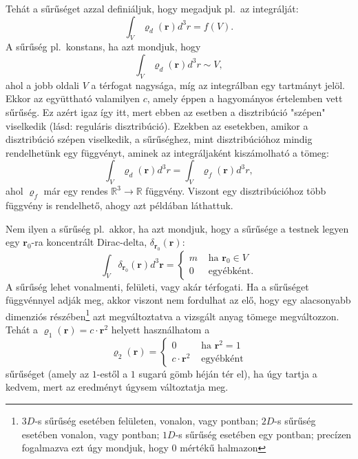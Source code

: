 \documentclass[12pt,a4paper]{scrartcl}
\let\mathbf\bm
\begin{document}
Tehát a sűrűséget azzal definiáljuk, hogy megadjuk pl.\ az integrálját:
\[\int_V {{\varrho _d}\left( {\mathbf{r}} \right){d^3}r}  = f\left( V \right).\]
A sűrűség pl.\ konstans, ha azt mondjuk, hogy
\[\int_V {{\varrho _d}\left( {\mathbf{r}} \right){d^3}r} \sim V,\]
ahol a jobb oldali $V$ a térfogat nagysága, míg az integrálban egy tartmányt jelöl. Ekkor az együttható valamilyen $c$, amely éppen a hagyományos értelemben vett sűrűség. Ez azért igaz így itt, mert ebben az esetben a disztribúció "szépen" viselkedik (lásd: reguláris disztribúció). Ezekben az esetekben, amikor a disztribúció szépen viselkedik, a sűrűséghez, mint disztribúcióhoz mindig rendelhetünk egy függvényt, aminek az integráljaként kiszámolható a tömeg:
\[\int_V {{\varrho _d}\left( {\mathbf{r}} \right){d^3}r}  = \int_V {{\varrho _f}\left( {\mathbf{r}} \right){d^3}r} ,\]
ahol $\varrho _f$ már egy rendes ${\mathbb{R}^3} \to \mathbb{R}$ függvény. Viszont egy disztribúcióhoz több függvény is rendelhető, ahogy azt \az{\eqref{eq:ugyanaz_a_tomeg}} példában láthattuk.

Nem ilyen a sűrűség pl.\ akkor, ha azt mondjuk, hogy a sűrűsége a testnek legyen egy ${{\mathbf{r}}_0}$-ra koncentrált Dirac-delta, $\delta_{{{\mathbf{r}}_0}} \left( {\mathbf{r}} \right)$:
\[\int_V {{\delta _{{{\mathbf{r}}_0}}}\left( {\mathbf{r}} \right)} {d^3}{\mathbf{r}} = \left\{ \begin{array}{lr}
  m&{\text{ ha }}{{\mathbf{r}}_0} \in V \\ 
  0&{\text{ egyébként.}}
\end{array} \right.\]
A sűrűség lehet vonalmenti, felületi, vagy akár térfogati. Ha a sűrűséget függvénnyel adják meg, akkor viszont nem fordulhat az elő, hogy egy alacsonyabb dimenziós részében\footnote{$3D$-s sűrűség esetében felületen, vonalon, vagy pontban; $2D$-s sűrűség esetében vonalon, vagy pontban; $1D$-s sűrűség esetében egy pontban; precízen fogalmazva ezt úgy mondjuk, hogy 0 mértékű halmazon} azt megváltoztatva a vizsgált anyag tömege megváltozzon. Tehát a ${\varrho _1}\left( {\mathbf{r}} \right) = c\cdot {{\mathbf{r}}^2}$ helyett használhatom a 
\[{\varrho _2}\left( {\mathbf{r}} \right) = \left\{ \begin{array}{lr}
  0&{\text{ ha }}{{\mathbf{r}}^2} = 1 \\
  c \cdot {{\mathbf{r}}^2}&{\text{ egyébként}}
\end{array} \right.\]
sűrűséget (amely az $1$-estől a $1$ sugarú gömb héján tér el), ha úgy tartja a kedvem, mert az eredményt úgysem változtatja meg.
\end{document}
